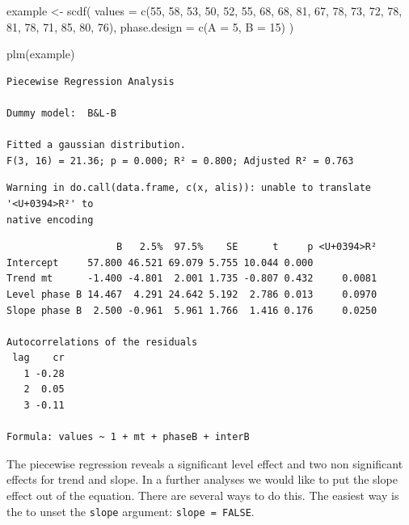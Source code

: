 \documentclass[
]{book}
\newenvironment{Shaded}{\begin{snugshade}}{\end{snugshade}}
\newcommand{\AttributeTok}[1]{\textcolor[rgb]{0.77,0.63,0.00}{#1}}
\newcommand{\DecValTok}[1]{\textcolor[rgb]{0.00,0.00,0.81}{#1}}
\newcommand{\FunctionTok}[1]{\textcolor[rgb]{0.00,0.00,0.00}{#1}}
\newcommand{\NormalTok}[1]{#1}
\newcommand{\OtherTok}[1]{\textcolor[rgb]{0.56,0.35,0.01}{#1}}
\begin{document}
\begin{Shaded}
\begin{Highlighting}[]
\NormalTok{example }\OtherTok{\textless{}{-}} \FunctionTok{scdf}\NormalTok{(}
   \AttributeTok{values =} \FunctionTok{c}\NormalTok{(}\DecValTok{55}\NormalTok{, }\DecValTok{58}\NormalTok{, }\DecValTok{53}\NormalTok{, }\DecValTok{50}\NormalTok{, }\DecValTok{52}\NormalTok{, }\DecValTok{55}\NormalTok{, }\DecValTok{68}\NormalTok{, }\DecValTok{68}\NormalTok{, }\DecValTok{81}\NormalTok{, }\DecValTok{67}\NormalTok{, }\DecValTok{78}\NormalTok{, }\DecValTok{73}\NormalTok{, }\DecValTok{72}\NormalTok{, }\DecValTok{78}\NormalTok{, }\DecValTok{81}\NormalTok{, }\DecValTok{78}\NormalTok{, }\DecValTok{71}\NormalTok{, }\DecValTok{85}\NormalTok{, }\DecValTok{80}\NormalTok{, }\DecValTok{76}\NormalTok{),}
   \AttributeTok{phase.design =} \FunctionTok{c}\NormalTok{(}\AttributeTok{A =} \DecValTok{5}\NormalTok{, }\AttributeTok{B =} \DecValTok{15}\NormalTok{)}
\NormalTok{)}

\FunctionTok{plm}\NormalTok{(example)}
\end{Highlighting}
\end{Shaded}

\begin{verbatim}
Piecewise Regression Analysis

Dummy model:  B&L-B 

Fitted a gaussian distribution.
F(3, 16) = 21.36; p = 0.000; R² = 0.800; Adjusted R² = 0.763
\end{verbatim}

\begin{verbatim}
Warning in do.call(data.frame, c(x, alis)): unable to translate '<U+0394>R²' to
native encoding
\end{verbatim}

\begin{verbatim}
                   B   2.5%  97.5%    SE      t     p <U+0394>R²
Intercept     57.800 46.521 69.079 5.755 10.044 0.000           
Trend mt      -1.400 -4.801  2.001 1.735 -0.807 0.432     0.0081
Level phase B 14.467  4.291 24.642 5.192  2.786 0.013     0.0970
Slope phase B  2.500 -0.961  5.961 1.766  1.416 0.176     0.0250

Autocorrelations of the residuals
 lag    cr
   1 -0.28
   2  0.05
   3 -0.11

Formula: values ~ 1 + mt + phaseB + interB
\end{verbatim}

The piecewise regression reveals a significant level effect and two non significant effects for trend and slope. In a further analyses we would like to put the slope effect out of the equation. There are several ways to do this. The easiest way is the to unset the \texttt{slope} argument: \texttt{slope\ =\ FALSE}.
\end{document}
